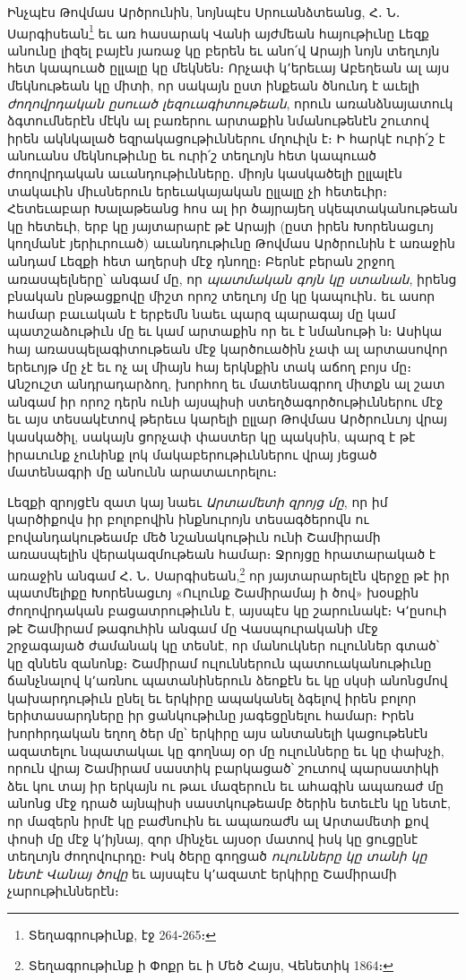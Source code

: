 \documentclass{article}
\begin{document}
{Ինչպէս Թովմաս Արծրունին, նոյնպէս Սրուանձտեանց, Հ․ Ն․ Սարգիսեան\footnote{Տեղագրութիւնք, էջ 264֊265։} եւ առ հասարակ Վանի այժմեան հայութիւնը Լեզք անունը լիզել բայէն յառաջ կը բերեն եւ անո՛վ Արայի նոյն տեղւոյն հետ կապուած ըլլալը կը մեկնեն։ Որչափ կ՚երեւայ Աբեղեան ալ այս մեկնութեան կը միտի, որ սակայն ըստ ինքեան ծնունդ է աւելի \emph{ժողովրդական ըսուած լեզուագիտութեան}, որուն առանձնայատուկ ձգտումներէն մէկն ալ բառերու արտաքին նմանութենէն շուտով իրեն ակնկալած եզրակացութիւններու մղուիլն է։ Ի հարկէ ուրի՛շ է անուանս մեկնութիւնը եւ ուրի՛շ տեղւոյն հետ կապուած ժողովրդական աւանդութիւնները․ միոյն կասկածելի ըլլալէն տակաւին միւսներուն երեւակայական ըլլալը չի հետեւիր։ Հետեւաբար Խալաթեանց հոս ալ իր ծայրայեղ սկեպտականութեան կը հետեւի, երբ կը յայտարարէ թէ Արայի (ըստ իրեն Խորենացւոյ կողմանէ յերիւրուած) աւանդութիւնը Թովմաս Արծրունին է առաջին անդամ Լեզքի հետ աղերսի մէջ դնողը։ Բերնէ բերան շրջող առասպելները՝ անգամ մը, որ \emph{պատմական գոյն կը ստանան}, իրենց բնական ընթացքովը միշտ որոշ տեղւոյ մը կը կապուին․ եւ ասոր համար բաւական է երբեմն նաեւ պարզ պարագայ մը կամ պատշաձութիւն մը եւ կամ արտաքին որ եւ է նմանութի ն։ Ասիկա հայ առասպելագիտութեան մէջ կարծուածին չափ ալ արտասովոր երեւոյթ մը չէ եւ ոչ ալ միայն հայ երկնքին տակ աճող բոյս մը։ Անշուշտ անդրադարձող, խորհող եւ մատենագրող միտքն ալ շատ անգամ իր որոշ դերն ունի այսպիսի ստեղծագործութիւններու մէջ եւ այս տեսակէտով թերեւս կարելի ըլլար Թովմաս Արծրունւոյ վրայ կասկածիլ, սակայն ցորչափ փաստեր կը պակսին, պարզ է թէ իրաւունք չունինք լոկ մակաբերութիւններու վրայ յեցած մատենագրի մը անունն արատաւորելու։

Լեզքի զրոյցէն զատ կայ նաեւ \emph{Արտամետի զրոյց մը}, որ իմ կարծիքովս իր բոլոբովին ինքնուրոյն տեսագծերովն ու բովանդակութեամբ մեծ նշանակութիւն ունի Շամիրամի առասպելին վերակազմութեան համար։ Ջրոյցը հրատարակած է առաջին անգամ Հ․ Ն․ Սարգիսեան,\footnote{Տեղագրութիւնք ի Փոքր եւ ի Մեծ Հայս, Վենետիկ 1864։} որ յայտարարելէն վերջը թէ իր պատմելիքը Խորենացւոյ «Ուլունք Շամիրամայ ի ծով» խօսքին ժողովրդական բացատրութիւնն է, այսպէս կը շարունակէ։ Կ՚ըսուի թէ Շամիրամ թագուհին անգամ մը Վասպուրականի մէջ շրջագայած ժամանակ կը տեսնէ, որ մանուկներ ուլուններ գտած՝ կը զննեն զանոնք։ Շամիրամ ուլուններուն պատուականութիւնը ճանչնալով կ՚առնու պատանիներուն ձեոքէն եւ կը սկսի անոնցմով կախարդութիւն ընել եւ երկիրը ապականել ձգելով իրեն բոլոր երիտասարդները իր ցանկութիւնը յագեցընելու համար։ Իրեն խորհրդական եղող ծեր մը՝ երկիրը այս անտանելի կացութենէն ազատելու նպատակաւ կը գողնայ օր մը ուլունները եւ կը փախչի, որուն վրայ Շամիրամ սաստիկ բարկացած՝ շուտով պարսատիկի ձեւ կու տայ իր երկայն ու թաւ մազերուն եւ ահագին ապառաժ մը անոնց մէջ դրած այնպիսի սաստկութեամբ ծերին ետեւէն կը նետէ, որ մազերն իրմէ կը բաժնուին եւ ապառաժն ալ Արտամետի քով փոսի մը մէջ կ՚իյնայ, զոր մինչեւ այսօր մատով իսկ կը ցուցընէ տեղւոյն ժողովուրդը։ Իսկ ծերը գողցած \emph{ուլունները կը տանի կը նետէ Վանայ ծովը} եւ այսպէս կ՚ազատէ երկիրը Շամիրամի չարութիւններէն։

}
\end{document}
